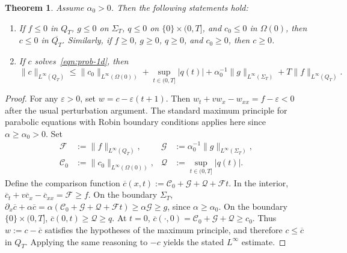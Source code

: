 \documentclass[11pt,reqno]{amsart}
\theoremstyle{plain}
\newtheorem{theorem}{Theorem}[section]
\theoremstyle{definition}
\numberwithin{equation}{section}
\newcommand{\abs}[1]{\left\lvert #1 \right\rvert}
\begin{document}
\begin{theorem}\label{thm:max_principle}
    Assume $\alpha_0 > 0$.
Then the following statements hold:
\begin{enumerate}
    \item If $f\le 0$ in $Q_T$, $g\le 0$ on $\Sigma_T$, $q\le 0$ on $\{0\}\times(0,T]$, and $c_0\le 0$ in $\Omega(0)$, then $c\le 0$ in $\overline{Q_T}$.
Similarly, if $f\ge 0$, $g\ge 0$, $q \ge 0$, and $c_0\ge 0$, then $c\ge 0$.
\item
If $c$ solves~\eqref{eqn:prob-1d}, then
\begin{equation}
\|c\|_{L^\infty(Q_T)}
\le
\|c_0\|_{L^\infty(\Omega(0))}
+
\sup_{t\in(0,T]}\abs{q(t)}
+
\alpha_0^{-1}\|g\|_{L^\infty(\Sigma_T)}
+
T\|f\|_{L^\infty(Q_T)}.
\end{equation}
\end{enumerate}
\end{theorem}

\begin{proof}
For any $\varepsilon>0$, set $w=c-\varepsilon(t+1)$. Then $w_t+v w_x-w_{xx}=f-\varepsilon<0$ after the usual perturbation argument.
The standard maximum principle for parabolic equations with Robin boundary conditions applies here since $\alpha \ge \alpha_0 > 0$.
Set
\begin{equation}
\begin{aligned}
\mathcal{F}&:=\|f\|_{L^\infty(Q_T)},&
\mathcal{G}&:= \alpha_0^{-1}\|g\|_{L^\infty(\Sigma_T)},\\
\mathcal{C}_0&:=\|c_0\|_{L^\infty(\Omega(0))},&
\mathcal{Q}&:= \sup_{t\in (0,T]}\abs{q(t)}.
\end{aligned}
\end{equation}
Define the comparison function $\overline c(x,t):= \mathcal{C}_0 + \mathcal{G} + \mathcal{Q} + \mathcal{F}t$.
In the interior, $\overline c_t + v \overline c_x - \overline c_{xx} = \mathcal{F} \ge f$.
On the boundary $\Sigma_T$, $\partial_x \overline c + \alpha \overline c = \alpha(\mathcal{C}_0+\mathcal{G}+\mathcal{Q}+\mathcal{F}t) \ge \alpha \mathcal{G} \ge g$, since $\alpha \ge \alpha_0$.
On the boundary $\{0\}\times(0,T]$, $\overline{c}(0,t) \ge \mathcal{Q} \ge q$.
At $t=0$, $\overline c(\cdot,0) = \mathcal{C}_0 + \mathcal{G} + \mathcal{Q} \ge c_0$.
Thus $w:=c-\overline c$ satisfies the hypotheses of the maximum principle, and therefore $c\le \overline c$ in $Q_T$. Applying the same reasoning to $-c$ yields the stated $L^\infty$ estimate.
\end{proof}
\end{document}
